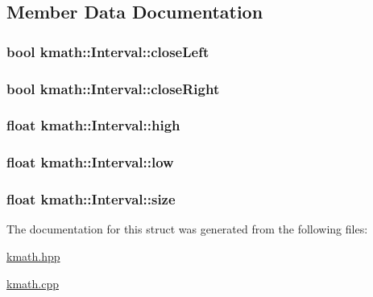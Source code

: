 \subsection{Member Data Documentation}
\hypertarget{structkmath_1_1_interval_a8301dbeccf9a042992eeb8bc4873fe83}{
\subsubsection[{close\-Left}]{\setlength{\rightskip}{0pt plus 5cm}bool {\bf kmath\-::\-Interval\-::close\-Left}}}\label{structkmath_1_1_interval_a8301dbeccf9a042992eeb8bc4873fe83}
\hypertarget{structkmath_1_1_interval_aa4962a6e38a17ff02321589ba9a4f990}{
\subsubsection[{close\-Right}]{\setlength{\rightskip}{0pt plus 5cm}bool {\bf kmath\-::\-Interval\-::close\-Right}}}\label{structkmath_1_1_interval_aa4962a6e38a17ff02321589ba9a4f990}
\hypertarget{structkmath_1_1_interval_ab89c246d6c21a786d5f09f837ff6d104}{
\subsubsection[{high}]{\setlength{\rightskip}{0pt plus 5cm}float {\bf kmath\-::\-Interval\-::high}}}\label{structkmath_1_1_interval_ab89c246d6c21a786d5f09f837ff6d104}
\hypertarget{structkmath_1_1_interval_ad575587eae91b8bce8f5ab4578f96d2b}{
\subsubsection[{low}]{\setlength{\rightskip}{0pt plus 5cm}float {\bf kmath\-::\-Interval\-::low}}}\label{structkmath_1_1_interval_ad575587eae91b8bce8f5ab4578f96d2b}
\hypertarget{structkmath_1_1_interval_a2988525850f7d1fb59b26efb1ee2b253}{
\subsubsection[{size}]{\setlength{\rightskip}{0pt plus 5cm}float {\bf kmath\-::\-Interval\-::size}}}\label{structkmath_1_1_interval_a2988525850f7d1fb59b26efb1ee2b253}


The documentation for this struct was generated from the following files\-:\begin{DoxyCompactItemize}
\item 
\hyperlink{kmath_8hpp}{kmath.\-hpp}\item 
\hyperlink{kmath_8cpp}{kmath.\-cpp}\end{DoxyCompactItemize}
